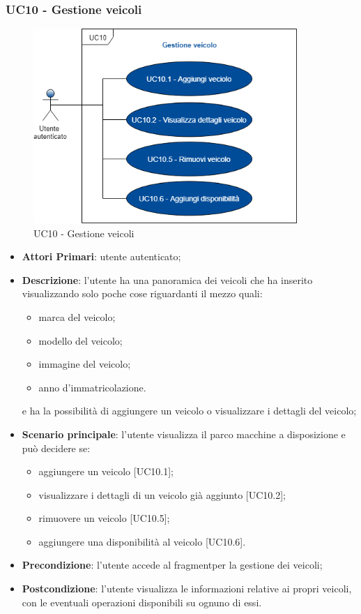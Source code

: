 \subsubsection{UC10 - Gestione veicoli}
  \begin{figure}[H]
 	\includegraphics[width=10cm]{res/images/UC10Gestioneveicolo.png}
 	\centering
 	\caption{UC10 - Gestione veicoli}
 \end{figure}
 \begin{itemize}
 	\item \textbf{Attori Primari}: utente autenticato;
 	\item \textbf{Descrizione}: l'utente ha una panoramica dei veicoli che ha inserito visualizzando solo poche cose riguardanti il mezzo quali:
 	\begin{itemize}
 		\item marca del veicolo;
 		\item modello del veicolo;
 		\item immagine del veicolo;
 		\item anno d'immatricolazione.
 	\end{itemize} 
 	e ha la possibilità di aggiungere un veicolo o visualizzare i dettagli del veicolo;
 	\item \textbf{Scenario principale}: l'utente visualizza il parco macchine a disposizione e può decidere se:
 	\begin{itemize}
 		\item aggiungere un veicolo [UC10.1];
 		\item visualizzare i dettagli di un veicolo già aggiunto [UC10.2];
 		\item rimuovere un veicolo [UC10.5];
 		\item aggiungere una disponibilità al veicolo [UC10.6].
 	\end{itemize}
 	\item \textbf{Precondizione}: l'utente accede al fragment\glosp per la gestione dei veicoli;
 	\item \textbf{Postcondizione}: l'utente visualizza le informazioni relative ai propri veicoli, con le eventuali operazioni disponibili su ognuno di essi.
 \end{itemize}
